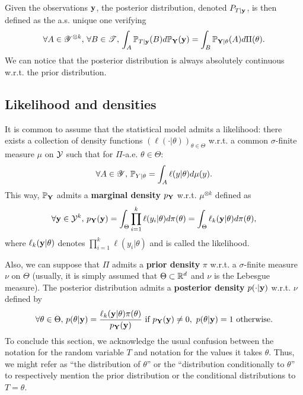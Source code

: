 Given the observations $\mathbf{y}$, the posterior distribution, denoted $P_{T|\mathbf{y}}$, is then defined as the a.s. unique one verifying
    \begin{equation}
        \forall A\in\mathscr{Y}^{\otimes k},\,\forall B\in\mathscr{T},\, \int_{A}\mathbb{P}_{T|\mathbf{y}}(B)d\mathbb{P}_{\mathbf{Y}}(\mathbf{y}) = \int_B \mathbb{P}_{\mathbf{Y}|\theta}(A)d\Pi(\theta).
    \end{equation}
We can notice that the posterior distribution is always absolutely continuous w.r.t. the prior distribution.


\subsection{Likelihood and densities}


It is common to assume that the statistical model admits a likelihood: there exists a collection of density functions $(\ell(\cdot|\theta))_{\theta\in\Theta}$  w.r.t. a common  $\sigma$-finite measure $\mu$ on $\mathcal{Y}$ such that for $\Pi$-a.e. $\theta\in\Theta$:
    \begin{equation}
        \forall A\in\mathscr{Y},\,\mathbb{P}_{Y|\theta} = \int_A\ell(y|\theta)d\mu(y).
    \end{equation}
This way, $\mathbb{P}_{\mathbf{Y}}$ admits a \textbf{marginal density} $p_{\mathbf{Y}}$ w.r.t. $\mu^{\otimes k}$ defined as
    \begin{equation}
        \forall\mathbf{y}\in\mathcal{Y}^k,\, p_{\mathbf{Y}}(\mathbf{y}) = \int_\Theta\prod_{i=1}^k\ell(y_i|\theta) d\pi(\theta) = \int_\Theta \ell_k(\mathbf{y}|\theta)d\pi(\theta),
    \end{equation}
where $\ell_k(\mathbf{y}|\theta)$ denotes $\prod_{i=1}^k\ell(y_i|\theta)$ and is called the likelihood.

Also, we can suppose that $\Pi$ admits a \textbf{prior density} $\pi$ w.r.t. a $\sigma$-finite measure $\nu$ on $\Theta$ (usually, it is simply assumed that $\Theta\subset\mathbb{R}^d$ and $\nu$ is the Lebesgue measure). 
The posterior distribution admits a \textbf{posterior density} $p(\cdot|\mathbf{y})$ w.r.t. $\nu$ defined by
    \begin{equation}
        \forall\theta\in\Theta,\, p(\theta|\mathbf{y}) = \frac{\ell_k(\mathbf{y}|\theta)\pi(\theta)}{p_{\mathbf{Y}}(\mathbf{y})}\text{\ if\ } p_{\mathbf{Y}}(\mathbf{y})\ne0,\ p(\theta|\mathbf{y})=1 \text{\ otherwise}.
    \end{equation}
To conclude this section, we acknowledge the usual confusion between the notation for the random variable $T$ and notation for the values it takes $\theta$. Thus, we might refer as ``the distribution of $\theta$'' or the ``distribution conditionally to $\theta$'' to respectively mention the prior distribution or the conditional distributions to $T=\theta$.


